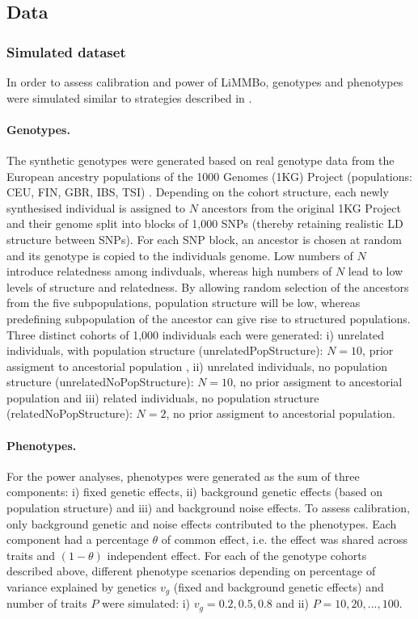 \subsection{Data}
\subsubsection{Simulated dataset}
\label{sssection:simulateddata}
In order to assess calibration and power of LiMMBo, genotypes and phenotypes were simulated similar to strategies described in \citep{Loh2014,Casale2015}.  
\paragraph{Genotypes.} The synthetic genotypes were generated based on real genotype data from the European ancestry populations of the 1000 Genomes (1KG) Project (populations: CEU, FIN, GBR, IBS, TSI) \citep{Abecasis2012}. Depending on the cohort structure, each newly synthesised individual is assigned to \(N\) ancestors from the original 1KG Project and  their genome split into blocks of 1,000 SNPs (thereby retaining realistic LD structure between SNPs). For each SNP block, an ancestor is chosen at random and its genotype is copied to the individuals genome. Low numbers of \(N\) introduce relatedness among indivduals, whereas high numbers of \(N\) lead to low levels of structure and relatedness. By allowing random selection of the ancestors from the five subpopulations, population structure will be low, whereas predefining subpopulation of the ancestor can give rise to structured populations. Three distinct cohorts of 1,000 individuals each were generated: i) unrelated individuals, with population structure (unrelatedPopStructure): \(N=10\), prior assigment to ancestorial population , ii) unrelated individuals, no population structure (unrelatedNoPopStructure): \(N=10\), no prior assigment to ancestorial population and iii) related individuals, no population structure (relatedNoPopStructure): \(N=2\), no prior assigment to ancestorial population.  
\paragraph{Phenotypes.} For the power analyses, phenotypes were generated as the sum 
of three components: i) fixed genetic effects, ii) background genetic effects (based on population structure) and iii) and background noise effects. To assess calibration, only background genetic and noise effects contributed to the phenotypes. Each component had a percentage \(\theta\) of common effect, i.e. the effect was shared across traits and \((1- \theta)\)  independent effect. For each of the genotype cohorts described above, different phenotype scenarios depending on percentage of variance explained by genetics \(v_g\) (fixed and background genetic effects) and number of traits \(P\) were simulated: i) \(v_g={0.2, 0.5, 0.8}\) and ii) \(P={10, 20, ..., 100}\).


